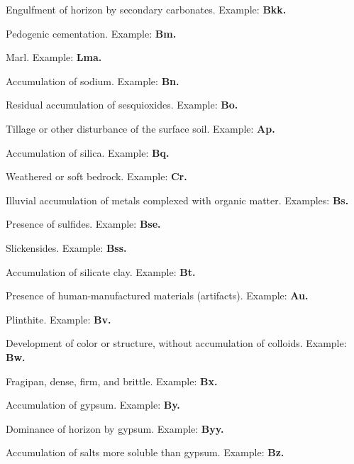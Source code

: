 \documentclass[12pt]{exam}
\begin{document}
\begin{description}[labelsep=1.80em, align=right]
\item[kk]
Engulfment of horizon by secondary carbonates. Example: \textbf{Bkk.}
\vspace{0.1in}
\item[m]
Pedogenic cementation. Example: \textbf{Bm.}
\vspace{0.1in}
\item[ma]
Marl. Example: \textbf{Lma.}
\vspace{0.1in}
\item[n]
Accumulation of sodium. Example: \textbf{Bn.}
\vspace{0.1in}
\item[o]
Residual accumulation of sesquioxides. Example: \textbf{Bo.}
\vspace{0.1in}
\item[p]
Tillage or other disturbance of the surface soil. Example: \textbf{Ap.}
\vspace{0.1in}
\item[q]
Accumulation of silica. Example: \textbf{Bq.}
\vspace{0.1in}
\item[r]
Weathered or soft bedrock. Example: \textbf{Cr.}
\vspace{0.1in}
\item[s]
Illuvial accumulation of metals complexed with organic matter. Examples: \textbf{Bs.}
\vspace{0.1in}
\item[se]
Presence of sulfides. Example: \textbf{Bse.}
\vspace{0.1in}
\item[ss]
Slickensides. Example: \textbf{Bss.}
\vspace{0.1in}
\item[t]
Accumulation of silicate clay. Example: \textbf{Bt.}
\vspace{0.1in}
\item[u]
Presence of human-manufactured materials (artifacts). Example: \textbf{Au.}
\vspace{0.1in}
\item[v]
Plinthite. Example: \textbf{Bv.}
\vspace{0.1in}
\item[w]
Development of color or structure, without accumulation of colloids. Example: \textbf{Bw.}
\vspace{0.1in}
\item[x]
Fragipan, dense, firm, and brittle. Example: \textbf{Bx.}
\vspace{0.1in}
\item[y]
Accumulation of gypsum. Example: \textbf{By.}
\vspace{0.1in}
\item[yy]
Dominance of horizon by gypsum. Example: \textbf{Byy.}
\vspace{0.1in}
\item[z]
Accumulation of salts more soluble than gypsum. Example: \textbf{Bz.}
\vspace{0.2in}


\end{description}
\end{document}
